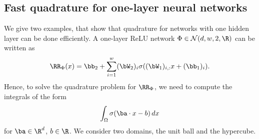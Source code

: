 \documentclass{amsart}[11pt]
\numberwithin{equation}{section}
\newcommand{\nn}{\mathcal{N}}
\numberwithin{theorem}{section}
\begin{document}
\subsection{Fast quadrature for one-layer neural networks}
We give two examples, that show that quadrature for networks with one hidden layer can be done efficiently.
A one-layer ReLU network $\Phi \in \nn(d,w,2, \R)$ can be written as
\begin{align*}
\RR_\Phi(x) =\bb_2+ \sum_{i=1}^w (\bW_2)_i\sigma((\bW_1)_{i,:}x+ (\bb_1)_i).
\end{align*}
Hence, to solve the quadrature problem for $\RR_\Phi$, we need to compute the integrals of the form 
\begin{align}\label{eq:intgoal}
    \int_{\Omega} \sigma(\ba\cdot x - b)\,dx
\end{align}
for $\ba\in \R^d$, $b\in\R$. We consider two domains, the unit ball and the hypercube.
\end{document}
